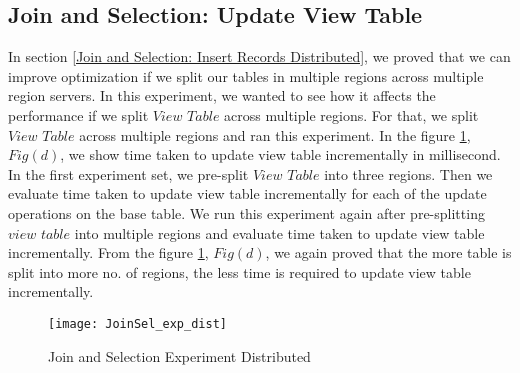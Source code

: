\documentclass[11pt,a4paper,bibtotoc,idxtotoc,headsepline,footsepline,footexclude,BCOR12mm,DIV13]{scrbook}
\begin{document}
\subsection{Join and Selection: Update View Table} 
\label{Join and Sel: Update View Table Distributed}

In section \ref{Join and Selection: Insert Records Distributed},  we proved that we can improve optimization if we split our tables in multiple regions across multiple region servers. In this experiment, we wanted to see how it affects the performance if we split $View$ $Table$ across multiple regions. For that, we split $View$ $Table$ across multiple regions and ran this experiment. 
In the figure \ref{sec:JoinSelExpDist}, $Fig(d)$, we show time taken to update view table incrementally in millisecond. In the first experiment set, we pre-split $View$ $Table$ into three regions. Then we evaluate time taken to update view table incrementally for each of the update operations on the base table. We run this experiment again after pre-splitting $view$ $table$ into multiple regions and evaluate time taken to update view table incrementally. From the figure \ref{sec:JoinSelExpDist}, $Fig(d)$, we again proved that the more table is split into more no. of regions, the less time is required to update view table incrementally. 

\begin{figure}
	\centering
	\texttt{[image: JoinSel\_exp\_dist]}
	\caption{Join and Selection Experiment Distributed}
	\label{sec:JoinSelExpDist}
	
\end{figure} 
\end{document}
